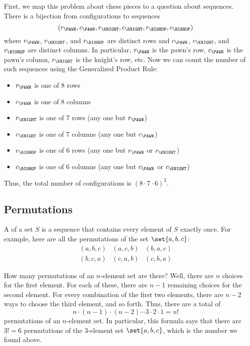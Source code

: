 First, we map this problem about chess pieces to a question about
sequences.  There is a bijection from configurations to sequences
%
\[
    (r_{\PAWN}, c_{\PAWN}, r_{\KNIGHT}, c_{\KNIGHT}, r_{\BISHOP}, c_{\BISHOP})
\]
%
where $r_{\PAWN}$, $r_{\KNIGHT}$, and $r_{\BISHOP}$ are distinct rows
and $c_{\PAWN}$, $c_{\KNIGHT}$, and $c_{\BISHOP}$ are distinct
columns.  In particular, $r_{\PAWN}$ is the pawn's row, $c_{\PAWN}$ is
the pawn's column, $r_{\KNIGHT}$ is the knight's row, etc.  Now we can
count the number of such sequences using the Generalized Product Rule:
\begin{itemize}\compactlist

\item $r_{\PAWN}$ is one of 8 rows

\item $c_{\PAWN}$ is one of 8 columns

\item $r_{\KNIGHT}$ is one of 7 rows (any one but $r_{\PAWN}$)

\item $c_{\KNIGHT}$ is one of 7 columns (any one but $c_{\PAWN}$)

\item $r_{\BISHOP}$ is one of 6 rows (any one but $r_{\PAWN}$ or
  $r_{\KNIGHT}$)

\item $c_{\BISHOP}$ is one of 6 columns (any one but $c_{\PAWN}$ or
  $c_{\KNIGHT}$)

\end{itemize}
Thus, the total number of configurations is $(8 \cdot 7 \cdot 6)^2$.

\subsection{Permutations}

A  of a set $S$ is a sequence that contains every
element of $S$ exactly once.  For example, here are all the
permutations of the set $\set{a, b, c}$:
%
\[
\begin{array}{ccc}
(a, b, c) & (a, c, b) & (b, a, c) \\
(b, c, a) & (c, a, b) & (c, b, a)
\end{array}
\]

How many permutations of an $n$-element set are there?  Well, there
are $n$ choices for the first element.  For each of these, there are
$n - 1$ remaining choices for the second element.  For every
combination of the first two elements, there are $n - 2$ ways to
choose the third element, and so forth.  Thus, there are a total of
%
\[
n \cdot (n-1) \cdot (n-2) \cdots 3 \cdot 2 \cdot 1 = n!
\]
%
permutations of an $n$-element set.  In particular, this formula says
that there are $3! = 6$ permutations of the 3-element set $\set{a, b,
c}$, which is the number we found above.

